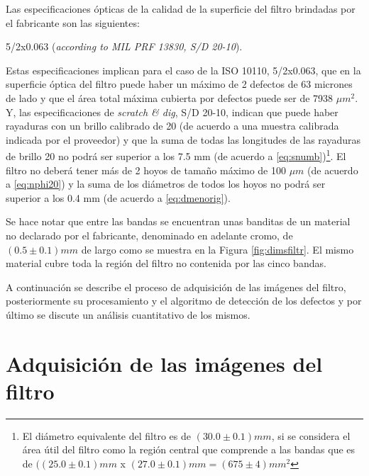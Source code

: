 Las especificaciones ópticas de la calidad de la superficie del filtro brindadas por el fabricante son las siguientes:
\begin{center}
5/2x0.063 (\textit{according to MIL PRF 13830, S/D 20-10}).
\end{center}

Estas especificaciones implican para el caso de la ISO 10110, 5/2x0.063, que en la superficie óptica del filtro puede haber un máximo de 2 defectos de 63 micrones de lado y que el área total máxima cubierta por defectos puede ser de 7938 $\mu m^{2}$. Y, las especificaciones de \textit{scratch \& dig}, S/D 20-10, indican que puede haber rayaduras con un brillo calibrado de 20 (de acuerdo a una muestra calibrada indicada por el proveedor) y que la suma de todas las longitudes de las rayaduras de brillo 20 no podrá ser superior a los 7.5 mm (de acuerdo a \ref{eq:snumb})\footnote{ El diámetro equivalente del filtro es de $(30.0 \pm 0.1 )mm$, si se considera el área útil del filtro como la región central que comprende a las bandas que es de $((25.0 \pm 0.1)mm$ x $(27.0 \pm 0.1) mm = (675 \pm 4) mm^{2}$}. El filtro no deberá tener más de 2 hoyos de tamaño máximo de 100 $\mu m$  (de acuerdo a \ref{eq:nphi20}) y la suma de los diámetros de todos los hoyos no podrá ser superior a los 0.4 mm (de acuerdo a \ref{eq:dmenorig}).

Se hace notar que entre las bandas se encuentran unas banditas de un material no declarado por el fabricante, denominado en adelante cromo, de $(0.5 \pm 0.1)mm $ de largo como se muestra en la Figura \ref{fig:dimsfiltr}. El mismo material cubre toda la región del filtro no contenida por las cinco bandas.

A continuación se describe el proceso de adquisición de las imágenes del filtro, posteriormente su procesamiento y el algoritmo de detección de los defectos y por último se discute un análisis cuantitativo de los mismos.



\singlespacing
\section{Adquisición de las imágenes del filtro}
\label{sec:conf}


